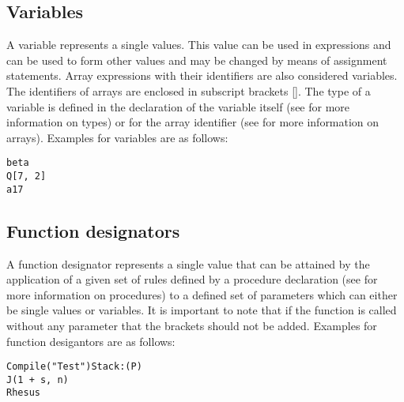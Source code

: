 \documentclass{article}
\begin{document}
\subsection{Variables}
A variable represents a single values. This value can be used in expressions and can be used to form other values and may be changed by means of assignment statements. Array expressions with their identifiers are also considered variables. The identifiers of arrays are enclosed in subscript brackets []. The type of a variable is defined in the declaration of the variable itself (see  for more information on types) or for the array identifier (see  for more information on arrays). Examples for variables are as follows:

\begin{lstlisting}[language={[60]algol}]
beta
Q[7, 2]
a17
\end{lstlisting}

\subsection{Function designators}
A function designator represents a single value that can be attained by the application of a given set of rules defined by a procedure declaration (see  for more information on procedures) to a defined set of parameters which can either be single values or variables. It is important to note that if the function is called without any parameter that the brackets should not be added. Examples for function desigantors are as follows:\\

\begin{lstlisting}[language={[60]algol}]
Compile("Test")Stack:(P)
J(1 + s, n)
Rhesus
\end{lstlisting}
\end{document}
